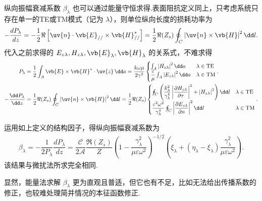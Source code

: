 \begin{note}
	纵向振幅衰减系数 \(\beta_{\lambda}\) 也可以通过能量守恒求得.表面阻抗定义同上，只考虑系统只存在单一的TE或TM模式（记为 \(\lambda\)），则单位纵向长度的损耗功率为
	\begin{align*}
		-\dfrac{d P_{\lambda}}{dz} = -\dfrac{1}{2} \Re\left[ \uv{n} \cdot \vb{E}_{//} \times \vb{H}_{//}^* \right] = \dfrac{1}{2} \Re(Z_s) \oint_C \left| \uv{n} \times \vb{H} \right|^2 \dd l.
	\end{align*}
	代入之前求得的 \(E_{z\lambda}, H_{z\lambda}, \vb{E}_{\lambda}, \vb{H}_{\lambda}\) 的关系式，不难求得
	\begin{align*}
		P_{\lambda} &= \dfrac{1}{2} \int_A \vb{E} \times \vb{H}^* \cdot \uv{z} \, \dd a = \dfrac{k\omega\mu}{2 \gamma^2} \begin{cases}
			\int_A \left| H_{z\lambda} \right|^2 \dd a                          & \lambda \in \text{TE} \\
			\dfrac{\varepsilon}{\mu} \int_A \left| E_{z\lambda} \right|^2 \dd a & \lambda \in \text{TM}
		\end{cases}.\\
		-\dfrac{\dd  P_{\lambda}}{\dd z} &= \dfrac{1}{2} \Re(Z_s) \oint_C \left| \uv{n} \times \vb{H} \right|^2 \dd l = \dfrac{1}{2} \Re(Z_s) \begin{cases}
			\oint_C \left( \dfrac{k_{\lambda}^2}{\gamma_{\lambda}^4} \left| \dfrac{\partial H_{z\lambda}}{\partial{\tau}} \right|^2 + \left| H_{z\lambda} \right|^2 \right) \dd l & \lambda \in \text{TE} \\
			\dfrac{\varepsilon^2 \omega^2}{\gamma_{\lambda}^4} \oint_C \left| \dfrac{\partial E_{z\lambda}}{\partial n} \right|^2 \dd l                                           & \lambda \in \text{TM}
		\end{cases}.
	\end{align*}

	运用如上定义的结构因子，得纵向振幅衰减系数为
	\begin{align*}
		\beta_{\lambda} = -\dfrac{1}{2 P_{\lambda}} \dfrac{d P_{\lambda}}{dz} = \dfrac{\mathcal{C}}{2 \mathcal{A}} \dfrac{\Re(Z_s)}{Z} \left( 1 - \dfrac{\gamma_{\lambda}^2}{\mu\varepsilon\omega^2} \right)^{-1/2} \left( \xi_{\lambda} + (\eta_{\lambda} - \xi_{\lambda}) \dfrac{\gamma_{\lambda}^2}{\mu\varepsilon\omega^2} \right).
	\end{align*}
	该结果与微扰法所求完全相同.

	显然，能量法求解 \(\beta_{\lambda}\) 更为直观且普适，但它也有不足，比如无法给出传播系数的修正，也较难处理简并情况的本征函数修正.
\end{note}

